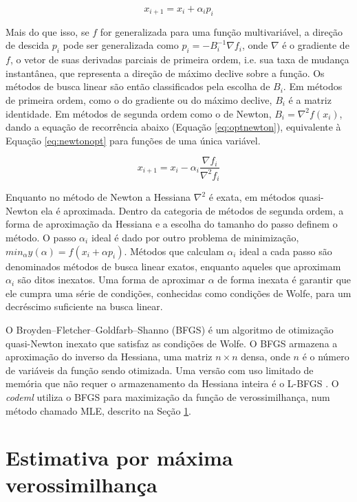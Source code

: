 \documentclass[cic,tc]{iiufrgs}
\begin{document}
\begin{equation}
\label{eq:opt}
x_{i + 1} = x_i + \alpha_i p_i
\end{equation}

Mais do que isso, se $f$ for generalizada para uma função multivariável, a
direção de descida $p_i$ pode ser generalizada como $p_i = -B_{i}^{-1} \nabla
f_i$, onde $\nabla$ é o gradiente de $f$, o vetor de suas derivadas parciais de
primeira ordem, i.e. sua taxa de mudança instantânea, que representa a direção
de máximo declive sobre a função. Os métodos de busca linear são então
classificados pela escolha de $B_i$. Em métodos de primeira ordem, como o do
gradiente ou do máximo declive, $B_i$ é a matriz identidade. Em métodos de
segunda ordem como o de Newton, $B_i = \nabla^2 f(x_i)$, dando a equação de
recorrência abaixo (Equação \ref{eq:optnewton}), equivalente à Equação
\ref{eq:newtonopt} para funções de uma única variável.

\begin{equation}
\label{eq:optnewton}
x_{i + 1} = x_i - \alpha_i \frac{\nabla f_i}{\nabla^2 f_i}
\end{equation}

Enquanto no método de Newton a Hessiana $\nabla^2$ é exata, em métodos
quasi-Newton ela é aproximada. Dentro da categoria de métodos de segunda ordem,
a forma de aproximação da Hessiana e a escolha do tamanho do passo definem o
método. O passo $\alpha_i$ ideal é dado por outro problema de minimização,
$min_\alpha y(\alpha) = f(x_i + \alpha p_i)$. Métodos que calculam $\alpha_i$
ideal a cada passo são denominados métodos de busca linear exatos, enquanto
aqueles que aproximam $\alpha_i$ são ditos inexatos. Uma forma de aproximar
$\alpha$ de forma inexata é garantir que ele cumpra uma série de condições,
conhecidas como condições de Wolfe, para um decréscimo suficiente na busca
linear.

O Broyden–Fletcher–Goldfarb–Shanno (BFGS) \cite{fletcher1980practical} é um
algoritmo de otimização quasi-Newton inexato que satisfaz as condições de
Wolfe. O BFGS armazena a aproximação do inverso da Hessiana, uma matriz $n
\times n$ densa, onde $n$ é o número de variáveis da função sendo otimizada.
Uma versão com uso limitado de memória que não requer o armazenamento da
Hessiana inteira é o L-BFGS \cite{liu1989limited}. O \textit{codeml} utiliza o BFGS para
maximização da função de verossimilhança, num método chamado MLE, descrito na
Seção \ref{sec:mle}.

\section{Estimativa por máxima verossimilhança}
\label{sec:mle}
\end{document}
